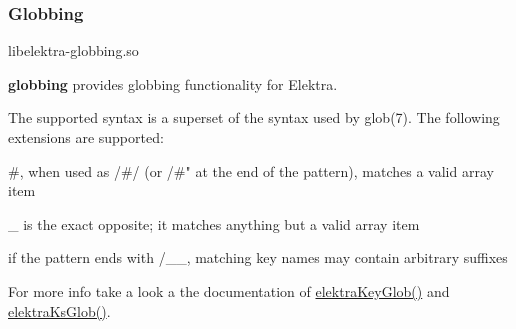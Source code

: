 \subsubsection*{Globbing}

\begin{DoxyVerb}libelektra-globbing.so
\end{DoxyVerb}


{\bfseries globbing} provides globbing functionality for Elektra.

The supported syntax is a superset of the syntax used by {\ttfamily glob(7)}. The following extensions are supported\+:


\begin{DoxyItemize}
\item {\ttfamily \#}, when used as {\ttfamily /\#/} (or {\ttfamily /\#"} at the end of the pattern), matches a valid array item
\item {\ttfamily \+\_\+} is the exact opposite; it matches anything but a valid array item
\item if the pattern ends with {\ttfamily /\+\_\+\+\_\+}, matching key names may contain arbitrary suffixes
\end{DoxyItemize}

For more info take a look a the documentation of {\ttfamily \hyperlink{globbing_8c_ad7700821df72fc0fc3bfc336e4368d29}{elektra\+Key\+Glob()}} and {\ttfamily \hyperlink{globbing_8c_a85baa9c79325ad1bf08e95cd82a4daf6}{elektra\+Ks\+Glob()}}. 